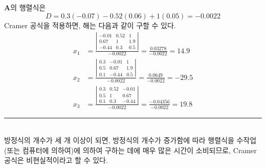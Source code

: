 $\mathbf{A}$의 행렬식은
\begin{equation*}
D=0.3(-0.07)-0.52(0.06)+1(0.05)=-0.0022
\end{equation*}
Cramer 공식을 적용하면, 해는 다음과 같이 구할 수 있다.
\begin{align*}
x_{1}&=\frac{\left|\begin{array}{ccc}-0.01&0.52&1\\0.67&1&1.9\\-0.44&0.3&0.5\end{array}\right|}{-0.0022}=\frac{0.03278}{-0.0022}=14.9\\
x_{2}&=\frac{\left|\begin{array}{ccc}0.3&-0.01&1\\0.5&0.67&1.9\\0.1&-0.44&0.5\end{array}\right|}{-0.0022}=\frac{0.0649}{-0.0022}=-29.5\\
x_{3}&=\frac{\left|\begin{array}{ccc}0.3&0.52&-0.01\\0.5&1&0.67\\0.1&0.3&-0.44\end{array}\right|}{-0.0022}=\frac{-0.04356}{-0.0022}=19.8
\end{align*}
\rule{\textwidth}{0.1pt}\\
방정식의 개수가 세 개 이상이 되면, 방정식의 개수가 증가함에 따라 행렬식을 수작업(또는 컴퓨터에 의하여)에 의하여 구하는 데에 매우 많은 시간이 소비되므로, Cramer 공식은 비현실적이라고 할 수 있다.
